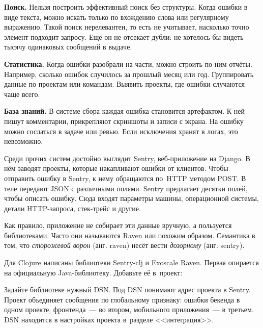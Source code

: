 \textbf{Поиск.} Нельзя построить эффективный поиск без структуры. Когда ошибки в
виде текста, можно искать только по вхождению слова или регулярному
выражению. Такой поиск нерелевантен, то есть не учитывает, насколько точно
элемент подходит запросу. Ещ\"{е} он не отсекает дубли: не хотелось бы видеть тысячу
одинаковых сообщений в выдаче.

\textbf{Статистика.} Когда ошибки разобрали на части, можно строить по ним
отч\"{е}ты. Например, сколько ошибок случилось за прошлый месяц или
год. Группировать данные по проектам или командам. Выявить проекты, где ошибки
случаются чаще всего.

\textbf{База знаний.} В системе сбора каждая ошибка становится артефактом. К ней
пишут комментарии, прикрепляют скриншоты и записи с экрана. На ошибку можно
сослаться в задаче или ревью. Если исключения хранят в логах, это невозможно.


Среди прочих систем достойно выглядит Sentry,
веб-приложение на Django. В н\"{е}м заводят проекты, которые накапливают ошибки
от клиентов. Чтобы отправить ошибку в Sentry, к нему обращаются по~HTTP методом
POST. В теле передают JSON с различными полями. Sentry предлагает десятки полей,
чтобы описать ошибку. Сюда входят параметры машины, операционной системы, детали
HTTP-запроса, стек-трейс и другие.


Как правило, приложение не собирает эти данные вручную, а пользуется
библиотеками. Часто они называются Raven или похожим образом. Семантика в том,
что \emph{сторожевой ворон} (анг. raven) нес\"{е}т вести \emph{дозорному}
(анг. sentry).

Для Clojure написаны библиотеки
Sentry-clj и Exoscale
Raven. Первая опирается на
официальную Java-библиотеку. Добавьте е\"{е} в~проект:

\begin{english}
  \begin{clojure}
  \end{clojure}
\end{english}


Задайте библиотеке нужный DSN. Под DSN понимают адрес проекта в Sentry. Проект
объединяет сообщения по глобальному признаку: ошибки бекенда в одном проекте,
фронтенда~--- во втором, мобильного приложения~--- в третьем. DSN находится в
настройках проекта в~разделе <<интеграция>>.

